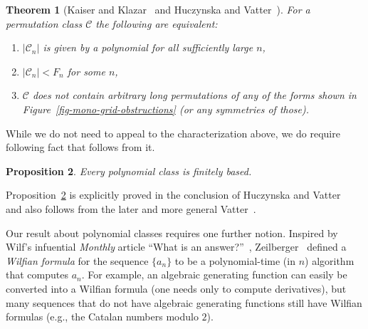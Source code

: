 \documentclass[10pt]{article}
\theoremstyle{plain}
\newtheorem{theorem}{Theorem}[section]
\newtheorem{proposition}[theorem]{Proposition}
\theoremstyle{definition}
\newcommand{\C}{\mathcal{C}}
\begin{document}
\begin{theorem}[Kaiser and Klazar~\cite{kaiser:on-growth-rates:} and Huczynska and Vatter~\cite{huczynska:grid-classes-an:}]
\label{thm-poly-tfae}
For a permutation class $\C$ the following are equivalent:
\begin{enumerate}
\item[(1)] $|\C_n|$ is given by a polynomial for all sufficiently large $n$,
\item[(2)] $|\C_n|<F_n$ for some $n$,
\item[(3)] $\C$ does not contain arbitrary long permutations of any of the forms shown in Figure~\ref{fig-mono-grid-obstructions} (or any symmetries of those).
\end{enumerate}
\end{theorem}

While we do not need to appeal to the characterization above, we do require following fact that follows from it.

\begin{proposition}
\label{prop-poly-fin-basis}
Every polynomial class is finitely based.	
\end{proposition}

Proposition~\ref{prop-poly-fin-basis} is explicitly proved in the conclusion of Huczynska and Vatter~\cite{huczynska:grid-classes-an:} and also follows from the later and more general Vatter~\cite[Theorem 6.2]{vatter:small-permutati:}.

Our result about polynomial classes requires one further notion. Inspired by Wilf's infuential \emph{Monthly} article ``What is an answer?''~\cite{wilf:what-is-an-answ:}, Zeilberger~\cite{Zeilberger:Enumerative-and:} defined a \emph{Wilfian formula} for the sequence $\{a_n\}$ to be a polynomial-time (in $n$) algorithm that computes $a_n$. For example, an algebraic generating function can easily be converted into a Wilfian formula (one needs only to compute derivatives), but many sequences that do not have algebraic generating functions still have Wilfian formulas (e.g., the Catalan numbers modulo $2$).
\end{document}
